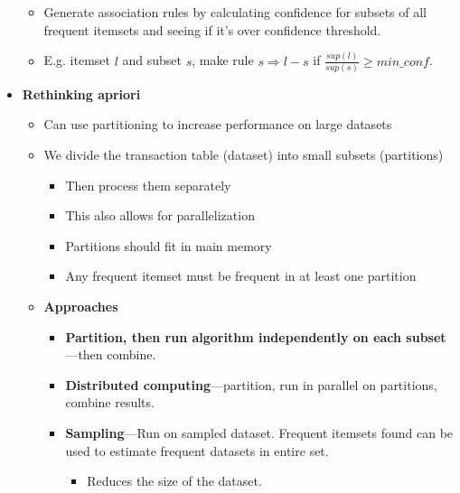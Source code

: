 \begin{multicols}{2}
\begin{itemize}
  \begin{itemize}
    \item
    Generate association rules by calculating confidence for subsets of
    all frequent itemsets and seeing if it's over confidence threshold.
  \item
    E.g. itemset \(l\) and subset \(s\), make rule \(s\Rightarrow l-s\)
    if \(\frac{sup(l)}{sup(s)}\ge min\_conf\).
  \end{itemize}
\item
  \textbf{Rethinking apriori}

  \begin{itemize}
    \item
    Can use partitioning to increase performance on large datasets
  \item
    We divide the transaction table (dataset) into small subsets
    (partitions)

    \begin{itemize}
        \item
      Then process them separately
    \item
      This also allows for parallelization
    \item
      Partitions should fit in main memory
    \item
      Any frequent itemset must be frequent in at least one partition
    \end{itemize}
  \item
    \textbf{Approaches}

    \begin{itemize}
        \item
      \textbf{Partition, then run algorithm independently on each
      subset}---then combine.
    \item
      \textbf{Distributed computing}---partition, run in parallel on
      partitions, combine results.
    \item
      \textbf{Sampling}---Run on sampled dataset. Frequent itemsets
      found can be used to estimate frequent datasets in entire set.

      \begin{itemize}
            \item
        Reduces the size of the dataset.
      \end{itemize}
    \end{itemize}
  \end{itemize}
\end{itemize}
\end{multicols}